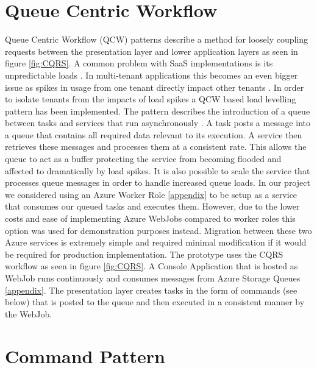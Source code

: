  
 \section{Queue Centric Workflow}
 
 Queue Centric Workflow (QCW) patterns describe a method for loosely coupling requests between the presentation layer and lower application layers as seen in figure \ref{fig:CQRS}. A common problem with SaaS implementations is its unpredictable loads \cite{Swanson}. In multi-tenant applications this becomes an even bigger issue as spikes in usage from one tenant directly impact other tenants \cite{Betts2012-ad}. In order to isolate tenants from the impacts of load spikes a QCW based load levelling pattern has been implemented. The pattern describes the introduction of a queue between tasks and services that run asynchronously \cite{Wilder2012-so}. A task posts a message into a queue that contains all required data relevant to its execution. A service then retrieves these messages and processes them at a consistent rate. This allows the queue to act as a buffer protecting the service from becoming flooded and affected to dramatically by load spikes.
It is also possible to scale the service that processes queue messages in order to handle increased queue loads. In our project we considered using an Azure Worker Role \ref{appendix} to be setup as a service that consumes our queued tasks and executes them. However, due to the lower costs and ease of implementing Azure WebJobs compared to worker roles this option was used for demonstration purposes instead. Migration between these two Azure services is extremely simple and required minimal modification if it would be required for production implementation. The prototype uses the CQRS workflow as seen in figure \ref{fig:CQRS}. A Console Application that is hosted as WebJob runs continuously and consumes messages from Azure Storage Queues \ref{appendix}. The presentation layer creates tasks in the form of commands (see below) that is posted to the queue and then executed in a consistent manner by the WebJob.
 
 
 
 \section{Command Pattern}
 
